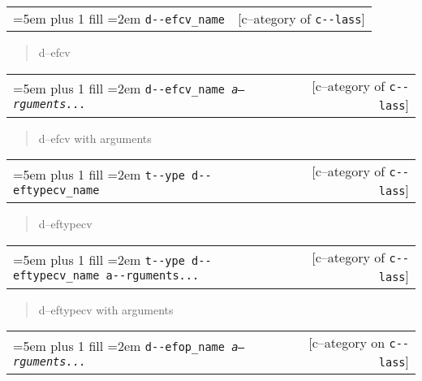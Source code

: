 \documentclass{book}
\begin{document}
\begin{titlepage}
\noindent\begin{tabularx}{\linewidth}{@{}Xr}
\rightskip=5em plus 1 fill
\hangindent=2em
\texttt{d{-}{-}efcv\_name}& [c--ategory of \texttt{c{-}{-}lass}]
\end{tabularx}

%
\begin{quote}
\unskip{\parskip=0pt\noindent}%
d--efcv
\end{quote}


\noindent\begin{tabularx}{\linewidth}{@{}Xr}
\rightskip=5em plus 1 fill
\hangindent=2em
\texttt{d{-}{-}efcv\_name \EmbracOn{}\textnormal{\textsl{a--rguments...}}\EmbracOff{}}& [c--ategory of \texttt{c{-}{-}lass}]
\end{tabularx}

%
\begin{quote}
\unskip{\parskip=0pt\noindent}%
d--efcv with arguments
\end{quote}


\noindent\begin{tabularx}{\linewidth}{@{}Xr}
\rightskip=5em plus 1 fill
\hangindent=2em
\texttt{t{-}{-}ype d{-}{-}eftypecv\_name}& [c--ategory of \texttt{c{-}{-}lass}]
\end{tabularx}

%
\begin{quote}
\unskip{\parskip=0pt\noindent}%
d--eftypecv
\end{quote}


\noindent\begin{tabularx}{\linewidth}{@{}Xr}
\rightskip=5em plus 1 fill
\hangindent=2em
\texttt{t{-}{-}ype d{-}{-}eftypecv\_name a{-}{-}rguments...}& [c--ategory of \texttt{c{-}{-}lass}]
\end{tabularx}

%
\begin{quote}
\unskip{\parskip=0pt\noindent}%
d--eftypecv with arguments
\end{quote}


\noindent\begin{tabularx}{\linewidth}{@{}Xr}
\rightskip=5em plus 1 fill
\hangindent=2em
\texttt{d{-}{-}efop\_name \EmbracOn{}\textnormal{\textsl{a--rguments...}}\EmbracOff{}}& [c--ategory on \texttt{c{-}{-}lass}]
\end{tabularx}


\end{titlepage}
\end{document}
